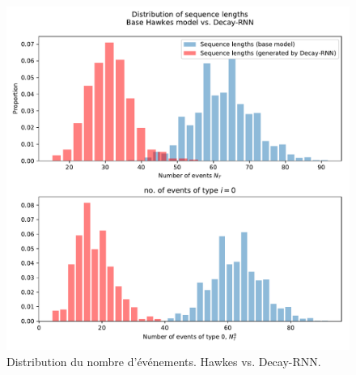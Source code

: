 \documentclass[11pt]{article}
\begin{document}
\begin{figure}[h]
	\includegraphics[width=\linewidth]{../results/seq_length_distrib_Decay-RNN-1d.pdf}
	\caption{Distribution du nombre d'événements. Hawkes vs. Decay-RNN.}\label{fig:hawkesDecayRNNlengthDistrib}
\end{figure}


\printbibliography

\begin{appendices}
	


\end{appendices}
\end{document}
